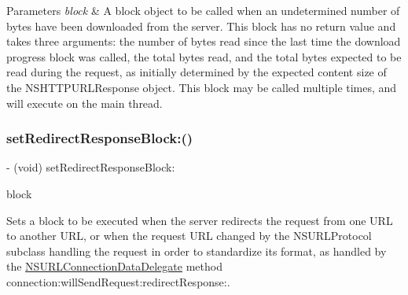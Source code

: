 \begin{DoxyParams}{Parameters}
{\em block} & A block object to be called when an undetermined number of bytes have been downloaded from the server. This block has no return value and takes three arguments\+: the number of bytes read since the last time the download progress block was called, the total bytes read, and the total bytes expected to be read during the request, as initially determined by the expected content size of the {\ttfamily N\+S\+H\+T\+T\+P\+U\+R\+L\+Response} object. This block may be called multiple times, and will execute on the main thread. \\
\hline
\end{DoxyParams}
\mbox{\label{interface_a_f_u_r_l_connection_operation_a844f5a93caf867e8c11dbae1cedb5e2f}} 
\subsubsection{\texorpdfstring{set\+Redirect\+Response\+Block\+:()}{setRedirectResponseBlock:()}\hspace{0.1cm}{\footnotesize\ttfamily [1/3]}}
{\footnotesize\ttfamily -\/ (void) set\+Redirect\+Response\+Block\+: \begin{DoxyParamCaption}\item[{(nullable N\+S\+U\+R\+L\+Request $\ast$($^\wedge$)(N\+S\+U\+R\+L\+Connection $\ast$connection, N\+S\+U\+R\+L\+Request $\ast$\mbox{\hyperlink{interface_a_f_u_r_l_connection_operation_a396bdfca5d7ad65dbface0a6df2c207c}{request}}, N\+S\+U\+R\+L\+Response $\ast$redirect\+Response))}]{block }\end{DoxyParamCaption}}

Sets a block to be executed when the server redirects the request from one U\+RL to another U\+RL, or when the request U\+RL changed by the {\ttfamily N\+S\+U\+R\+L\+Protocol} subclass handling the request in order to standardize its format, as handled by the {\ttfamily \mbox{\hyperlink{class_n_s_u_r_l_connection_data_delegate-p}{N\+S\+U\+R\+L\+Connection\+Data\+Delegate}}} method {\ttfamily connection\+:will\+Send\+Request\+:redirect\+Response\+:}.


